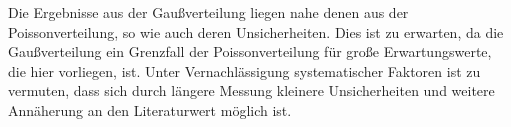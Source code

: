 \documentclass[slug=LM, room=Andreas-Schubert-Bau\,\ K\ 1A, supervisor=Anne-Sophie\ Berthold, coursedate=13.\ 12.\ 2019]{../../Lab_Report_LaTeX/lab_report}
\begin{document}


Die Ergebnisse aus der Gaußverteilung liegen nahe denen aus der
Poissonverteilung, so wie auch deren Unsicherheiten. Dies ist zu
erwarten, da die Gaußverteilung ein Grenzfall der Poissonverteilung
f\"ur gro\ss{}e Erwartungswerte, die hier vorliegen, ist. Unter
Vernachl\"assigung systematischer Faktoren ist zu vermuten, dass sich
durch l\"angere Messung kleinere Unsicherheiten und weitere
Ann\"aherung an den Literaturwert m\"oglich ist.
\end{document}
